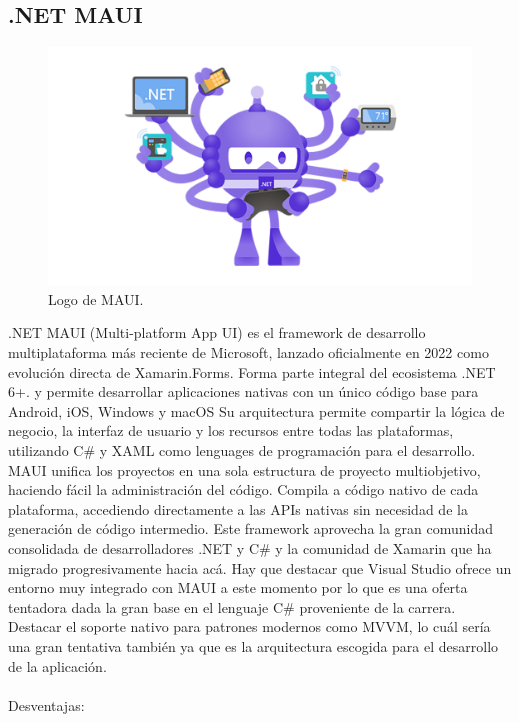 \subsection{.NET MAUI}
\begin{figure}[h]
    \centering
    \includegraphics[scale=0.15]{Graphics/MAUI.png}
    \caption{Logo de MAUI.}
    \label{fig:figura10}
\end{figure}
.NET MAUI (Multi-platform App UI) es el framework de desarrollo multiplataforma más reciente de Microsoft, lanzado oficialmente en 2022 como evolución directa de Xamarin.Forms. Forma parte integral del ecosistema .NET 6+.
y permite desarrollar aplicaciones nativas con un único código base para Android, iOS, Windows y macOS
Su arquitectura permite compartir la lógica de negocio, la interfaz de usuario y los recursos entre todas las plataformas, utilizando C\# y XAML como lenguages de programación para el desarrollo.
MAUI unifica los proyectos en una sola estructura de proyecto multiobjetivo, haciendo fácil la administración del código. Compila a código nativo de cada plataforma, accediendo directamente a las APIs nativas sin necesidad de la generación de código intermedio.
Este framework aprovecha la gran comunidad consolidada de desarrolladores .NET y C\# y la comunidad de Xamarin que ha migrado progresivamente hacia acá.
Hay que destacar que Visual Studio ofrece un entorno muy integrado con MAUI a este momento por lo que es una oferta tentadora dada la gran base en el lenguaje C\# proveniente de la carrera.
Destacar el soporte nativo para patrones modernos como MVVM, lo cuál sería una gran tentativa también ya que es la arquitectura escogida para el desarrollo de la aplicación.\\\\
Desventajas:
